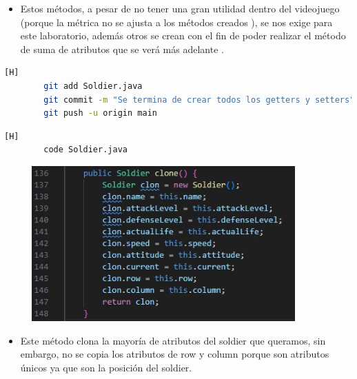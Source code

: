 \documentclass{article}
\begin{document}
	
	
	\begin{itemize}	
		\item Estos métodos, a pesar de no tener una gran utilidad dentro del videojuego (porque la métrica no se ajusta a los métodos creados ), se nos exige para este laboratorio, además otros se crean con el fin de poder realizar el método de suma de atributos que se verá más adelante . 
	\end{itemize}

	\begin{lstlisting}[language=bash,caption={Commit: 28c2163ac9e7a02e2c83549533267a8c22e28547}][H]
		git add Soldier.java
		git commit -m "Se termina de crear todos los getters y setters"			
		git push -u origin main
	\end{lstlisting}
		
	
	
	
	
	\begin{lstlisting}[language=bash,caption={Se crea el método que clonará la mayoría de atributos de un soldier }][H]
		code Soldier.java
	\end{lstlisting}
	
	\begin{figure}[H]
		\centering
		\includegraphics[width=0.9\textwidth,keepaspectratio]{img/clone.jpg}
	\end{figure}
	
	\begin{itemize}	
		\item Este método clona la mayoría de atributos del soldier que queramos, sin embargo, no se copia los atributos de row y column porque son atributos únicos ya que son la posición del soldier.
	\end{itemize}
	
\end{document}
